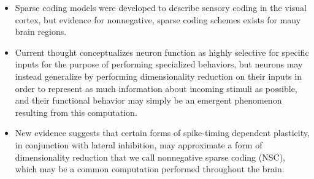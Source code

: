 \begin{itemize}
\item Sparse coding models were developed to describe sensory coding in the visual cortex, but evidence for nonnegative, sparse coding schemes exists for many brain regions.

\item  Current thought conceptualizes neuron function as highly selective for specific inputs for the purpose of performing specialized behaviors, but neurons may instead generalize by performing dimensionality reduction on their inputs in order to represent as much information about incoming stimuli as possible, and their functional behavior may simply be an emergent phenomenon resulting from this computation.

\item New evidence suggests that certain forms of spike-timing dependent plasticity, in conjunction with lateral inhibition, may approximate a form of dimensionality reduction that we call nonnegative sparse coding (\ac{NSC}), which may be a common computation performed throughout the brain.




\end{itemize}








